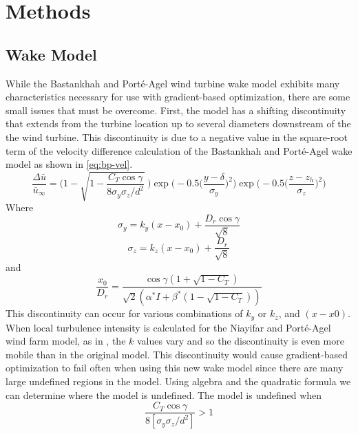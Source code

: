 \documentclass[conf]{new-aiaa}
\begin{document}
\section{Methods}

\subsection{Wake Model}

While the Bastankhah and Port\'{e}-Agel wind turbine wake model exhibits many characteristics necessary for use with gradient-based optimization, there are some small issues that must be overcome. First, the model has a shifting discontinuity that extends from the turbine location up to several diameters downstream of the the wind turbine. This discontinuity is due to a negative value in the square-root term of the velocity difference calculation of the Bastankhah and Port\'{e}-Agel wake model as shown in \cref{eq:bp-vel}. 
\begin{equation}\label{eq:bp-vel}
	\frac{\Delta \bar{u}}{\bar{u}_{\infty}} = \Bigg(1-\sqrt{1-\frac{C_T \cos{\gamma}}{8 \sigma_y \sigma_z/d^2}}~\Bigg) \exp{\bigg(-0.5\Big(\frac{y-\delta}{\sigma_y}\Big)^2\bigg)}\exp{\bigg(-0.5\Big(\frac{z-z_h}{\sigma_z}\Big)^2\bigg)}
\end{equation}
%
Where 
%
\begin{equation}\label{eq:sigmay}
	\sigma_y = k_y (x - x_0) + \frac{D_r \cos{\gamma}}{\sqrt{8}}
\end{equation}
%
%
\begin{equation}\label{eq:sigmaz}
	\sigma_z = k_z (x - x_0) + \frac{D_r}{\sqrt{8}}
\end{equation}
%
and
%
\begin{equation}
	\frac{x_0}{D_r} = \frac{\cos{\gamma }(1+\sqrt{1-C_T})}{\sqrt{2} (\alpha ^* I + \beta ^* (1- \sqrt{1-C_T}))}
\end{equation}
This discontinuity can occur for various combinations of $k_y$ or $k_z$, and $(x-x0)$. When local turbulence intensity is calculated for the Niayifar and Port\'{e}-Agel wind farm model, as in \cite{niayifar2015,niayifar2016}, the $k$ values vary and so the discontinuity is even more mobile than in the original model. This discontinuity would cause gradient-based optimization to fail often when using this new wake model since there are many large undefined regions in the model. Using algebra and the quadratic formula we can determine where the model is undefined. The model is undefined when
%
\begin{equation}
	\frac{C_T \cos{\gamma}}{8[\sigma_y \sigma_z/d^2]} > 1
\end{equation}
\end{document}
